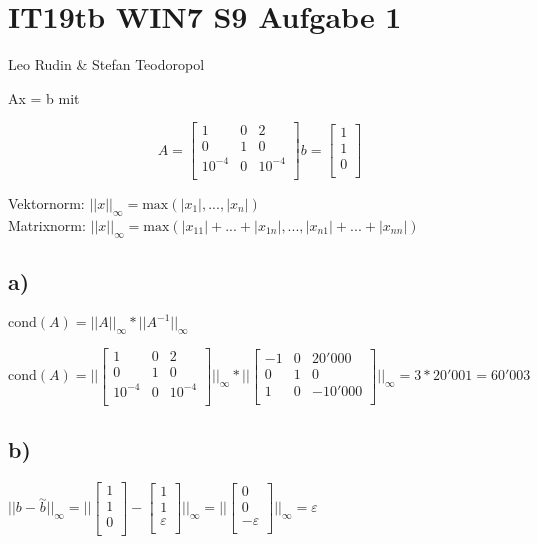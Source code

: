 \documentclass{article}
\begin{document}
\section*{IT19tb WIN7 S9 Aufgabe 1}
Leo Rudin \& Stefan Teodoropol

Ax = b mit

\[
A =
\begin{bmatrix} 
1 & 0 & 2 \\
0 & 1 & 0 \\
10^{-4} & 0 & 10^{-4} \\
\end{bmatrix}
b =
\begin{bmatrix} 
1 \\
1 \\
0 \\
\end{bmatrix}
\]

Vektornorm: \(||x||_\infty = \text{max}(|x_1|,...,|x_n|)\)\\
Matrixnorm: \(||x||_\infty = \text{max}(|x_{11}|+...+|x_{1n}|,...,|x_{n1}|+...+|x_{nn}|)\)

\subsection*{a)}

\(\text{cond}(A) = ||A||_\infty * ||A^{-1}||_\infty \)

\(\text{cond}(A) = ||
\begin{bmatrix} 
1 & 0 & 2 \\
0 & 1 & 0 \\
10^{-4} & 0 & 10^{-4} \\
\end{bmatrix}
||_\infty * ||
\begin{bmatrix} 
-1 & 0 & 20'000 \\
0 & 1 & 0 \\
1 & 0 & -10'000 \\
\end{bmatrix}
||_\infty = 3 * 20'001 = 60'003\)

\subsection*{b)}

\(||b - \overset{\sim}{b}||_\infty = ||
\begin{bmatrix} 
1 \\
1 \\
0 \\
\end{bmatrix}
-
\begin{bmatrix} 
1 \\
1 \\
\varepsilon \\
\end{bmatrix}
||_\infty
=
||
\begin{bmatrix} 
0 \\
0 \\
-\varepsilon \\
\end{bmatrix}
||_\infty
=
\varepsilon
\)
\end{document}
